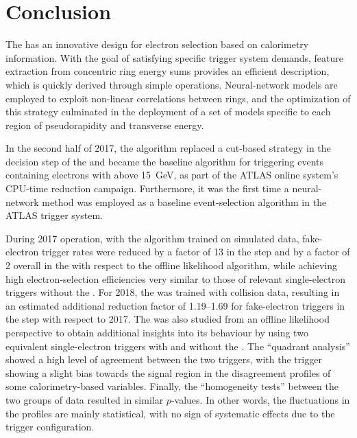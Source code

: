 \section{Conclusion}\label{sec:conclusion}


The \rnn{} has an innovative design for electron selection based on
calorimetry information. With the
goal of satisfying specific trigger system demands, feature extraction
from concentric ring energy sums provides an efficient description, which is quickly derived through simple operations. 
Neural-network models are employed to exploit non-linear correlations between rings, and the optimization of this strategy 
culminated in the deployment of a set of models specific to each region of pseudorapidity and transverse energy. 


In the second half of 2017, the \rnn{} algorithm replaced a cut-based strategy
in the \fastcalo{} decision step of the \hlt{} and became the baseline algorithm
for triggering events containing electrons with \ET above \SI{15}{\GeV}, 
as part of the ATLAS online system's CPU-time reduction campaign. 
Furthermore, it was the first time a neural-network method was employed as a 
baseline event-selection algorithm in the ATLAS trigger system.


During 2017 operation, with the \rnn{} algorithm trained on simulated data, 
fake-electron trigger rates were reduced by a factor of 13 in the \fastcalo{} step 
and by a factor of 2 overall in the \hlt{} with respect to the offline likelihood algorithm, while
achieving high electron-selection efficiencies very similar to those of relevant single-electron triggers without the \rnn{}. 
For 2018, the \rnn{} was trained with collision
data, resulting in an estimated additional reduction factor of 1.19--1.69 for fake-electron triggers in the \fastcalo{} step with respect to 2017. 
The \rnn{} was also studied from an offline likelihood perspective to obtain additional insights into its behaviour by using two equivalent single-electron triggers with and without the \rnn{}. The \enquote{quadrant analysis} showed a high level of agreement between the two triggers, with the \rnn{} trigger showing a slight bias towards the signal region in the disagreement profiles of some calorimetry-based variables. Finally, the \enquote{homogeneity tests} between the two groups of data resulted in similar $p$-values. In other words, the fluctuations in the profiles are mainly statistical, with no sign of systematic effects due to the trigger configuration.



